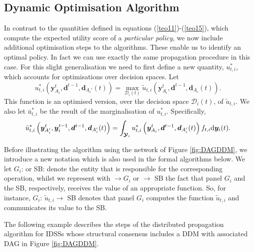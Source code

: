 \subsection{Dynamic Optimisation Algorithm}
In contrast to the quantities defined  in equations (\ref{teo11})-(\ref{teo15}), which compute the expected utility score of a \textit{particular policy}, we now include additional optimisation steps to the algorithms. These  enable us to identify an optimal policy. In fact we can use exactly the same propagation procedure in this case. For this slight generalisation we need to first define a new quantity, $u_{t,i}^*$, which accounts for optimisations over decision spaces. Let
\begin{equation}
\label{opt1}
u_{t,i}^*\left(\bm{y}^t_{A_i}, \bm{d}^{t-1},\bm{d}_{A_i'}(t)\right)=\max_{\mathcal{D}_i(t)}\tilde{u}_{t,i}\left(\bm{y}^t_{A_i}, \bm{d}^{t-1},\bm{d}_{A_i}(t)\right).
\end{equation}
This function is  an optimised version, over the decision space $\mathcal{D}_i(t)$, of $\tilde{u}_{t,i}$. We also let $\bar{u}^*_{t,i}$ be the result of the marginalisation of $u^*_{t,i}$. Specifically, 
\begin{equation}
\label{opt2}
\bar{u}_{t,i}^*\left(\bm{y}^t_{A_i'}, \bm{y}_i^{t-1}, \bm{d}^{t-1}, \bm{d}_{A_i'}(t)\right)=\int_{\bm{\mathcal{Y}}_i}u_{t,i}^*\left(\bm{y}^t_{A_i}, \bm{d}^{t-1},\bm{d}_{A_i'}(t)\right)f_{t,i}\dr \bm{y}_i(t).
\end{equation}
 
Before illustrating the algorithm using the network of Figure \ref{fig:DAGDDM}, we  introduce a new notation which is also used in the formal algorithms below.  We let $G_i$: or SB: denote the entity that is responsible for the corresponding operation, whilst we represent with $\longrightarrow G_i$ or $\longrightarrow$ SB the fact that panel $G_i$ and the SB, respectively, receives the value of an appropriate function. So, for instance, $G_i$:  $\tilde{u}_{t,i}\longrightarrow$ SB  denotes that panel $G_i$ computes the function $\tilde{u}_{t,i}$ and communicates its value to the SB.

The following example describes the steps of the distributed propagation algorithm for IDSSs whose structural consensus includes a DDM with associated DAG in Figure \ref{fig:DAGDDM}.

